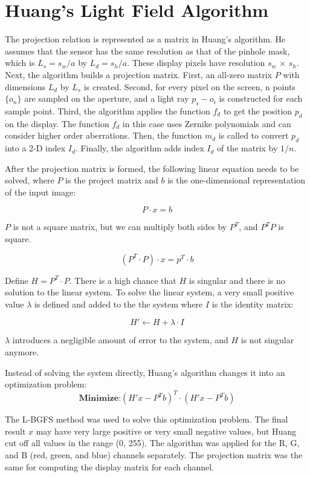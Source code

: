 \section{Huang's Light Field Algorithm}

The projection relation is represented as a matrix in Huang's algorithm. He assumes that the sensor has the same resolution as that of the pinhole mask, which is $L_s = s_w / a$ by $L_d = s_h / a$. These display pixels have resolution $s_w$ $\times$ $s_h$. 
Next, the algorithm builds a projection matrix. First, an all-zero matrix $P$ with dimensions $L_d$ by $L_s$ is created. Second, for every pixel on the screen, n points $\{o_n\}$ are sampled on the aperture, and a light ray $p_s - o_i$ is constructed for each sample point. Third, the algorithm applies the function $f_d$ to get the position $p_d$ on the display. The function $f_d$ in this case uses Zernike polynomials and can consider higher order aberrations. Then, the function $m_d$ is called to convert $p_d$ into a 2-D index $I_d$. Finally, the algorithm adds index $I_d$ of the matrix by $1/n$. 

After the projection matrix is formed, the following linear equation needs to be solved, where $P$ is the project matrix and $b$ is the one-dimensional representation of the input image:

$$P \cdot x = b$$

$P$ is not a square matrix, but we can multiply both sides by $P^{T}$, and $P^{T}P$ is square.

$$(P^T \cdot P) \cdot x = p^T \cdot b$$

Define $H = P^T \cdot P$. There is a high chance that $H$ is singular and there is no solution to the linear system. To solve the linear system, a very small positive value $\lambda$ is defined and added to the the system where $I$ is the identity matrix:

$$H' \leftarrow H + \lambda \cdot I$$

$\lambda$ introduces a negligible amount of error to the system, and $H$ is not singular anymore.

Instead of solving the system directly, Huang's algorithm changes it into an optimization problem: \\

$$\textbf{Minimize:} (H'x - P^Tb)^T \cdot (H'x-P^Tb)$$

The L-BGFS method \cite{Liu1989} was used to solve this optimization problem. The final result $x$ may have very large positive or very small negative values, but Huang cut off all values in the range (0, 255). The algorithm was applied for the R, G, and B (red, green, and blue) channels separately. The projection matrix was the same for computing the display matrix for each channel.

